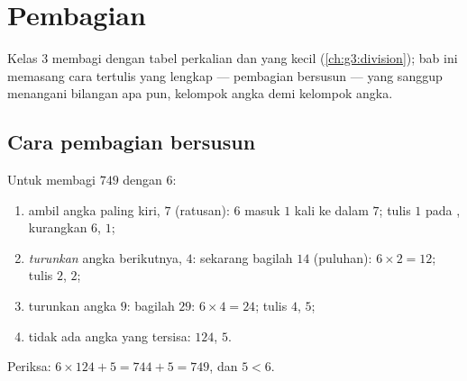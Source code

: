 \chapter{Pembagian}\label{ch:g4:division}

Kelas 3 membagi dengan tabel perkalian dan  yang kecil
(\cref{ch:g3:division}); bab ini memasang cara tertulis yang lengkap
--- pembagian bersusun --- yang sanggup menangani bilangan apa pun,
kelompok angka demi kelompok angka.

\section{Cara pembagian bersusun}

\begin{method}\label{met:g4:division:method}
Untuk membagi $749$ dengan $6$:
\begin{enumerate}
  \item ambil angka paling kiri, $7$ (ratusan): $6$ masuk $1$ kali
        ke dalam $7$; tulis $1$ pada , kurangkan $6$,
         $1$;
  \item \emph{turunkan} angka berikutnya, $4$: sekarang bagilah $14$
        (puluhan): $6 \times 2 = 12$; tulis $2$,  $2$;
  \item turunkan angka $9$: bagilah $29$: $6 \times 4 = 24$; tulis
        $4$,  $5$;
  \item tidak ada angka yang tersisa:  $124$,  $5$.
\end{enumerate}
Periksa: $6 \times 124 + 5 = 744 + 5 = 749$, dan $5 < 6$.
\end{method}

